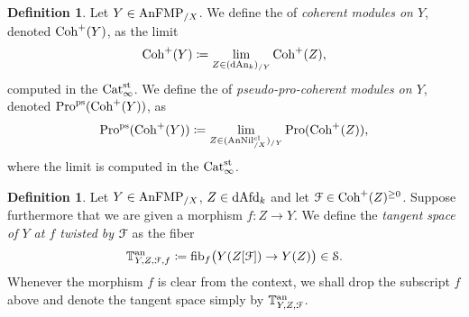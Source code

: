 \documentclass[10pt,a4paper,reqno]{amsart} %
\theoremstyle{plain}
\theoremstyle{definition}
\newtheorem{defin}[thm]{Definition}
\theoremstyle{remark}
\numberwithin{equation}{section}
\begin{document}
\begin{defin}
    Let $Y \in \mathrm{AnFMP}_{/X}$. We define the \infcat of \emph{coherent modules on $Y$}, denoted $\mathrm{Coh}^+(Y)$, as the limit
        \[
            \mathrm{Coh}^+(Y) \coloneqq \lim_{Z \in (\mathrm{dAn}_k)_{/Y}}  \mathrm{Coh}^+(Z),
        \]
    computed in the \infcat $\mathrm{Cat}_{\infty}^{\mathrm{st}}$. We define the \infcat of \emph{pseudo-pro-coherent modules on $Y$}, denoted $\mathrm{Pro}^{\mathrm{ps}}(\mathrm{Coh}^+(Y))$, as
        \[
            \mathrm{Pro}^\mathrm{ps}(\mathrm{Coh}^+(Y)) \coloneqq \lim_{Z \in (\mathrm{AnNil}_{/X}^{\mathrm{cl}})_{/Y}} \mathrm{Pro}(\mathrm{Coh}^+(Z)),  
        \]
    where the limit is computed in the \infcat $\mathrm{Cat}_{\infty}^{\mathrm{st}}$.
\end{defin}

\begin{defin} Let $Y \in \mathrm{AnFMP}_{/X}$, $Z \in \mathrm{dAfd}_k$ and let $\mathcal F \in \mathrm{Coh}^+(Z)^{\ge 0}$. Suppose furthermore that we are given a morphism $f \colon Z \to Y$.
    We define the \emph{tangent space of $Y$ at $f$ twisted by $\mathcal F$} as the fiber
        \[
            \mathbb T^\mathrm{an}_{Y, Z, \mathcal F,f} \coloneqq \mathrm{fib}_f\big( Y(Z[\mathcal F]) \to Y(Z) \big) 
            \in \mathcal S.  
        \]
    Whenever the morphism $f$ is clear from the context, we shall drop the subscript $f$ above and denote the tangent space
    simply by $\mathbb T^\mathrm{an}_{Y, Z, \mathcal F}$.
\end{defin}
\end{document}
